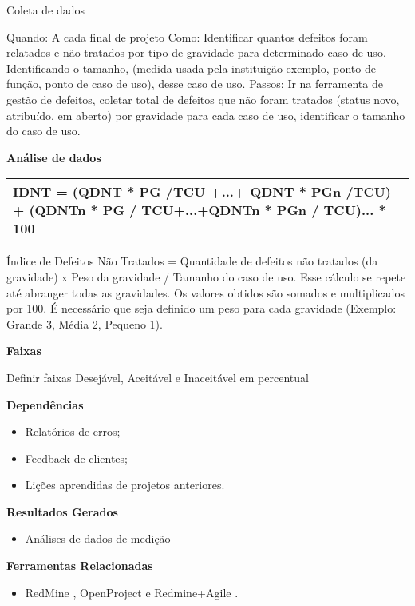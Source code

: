 Coleta de dados

Quando: A cada final de projeto Como: Identificar quantos defeitos foram relatados e não tratados por tipo de gravidade para determinado caso de uso. Identificando o tamanho, (medida usada pela instituição exemplo, ponto de função, ponto de caso de uso), desse caso de uso. Passos: Ir na ferramenta de gestão de defeitos, coletar total de defeitos que não foram tratados (status novo, atribuído, em aberto) por gravidade para cada caso de uso, identificar o tamanho do caso de uso.

\textbf{Análise de dados}

\begin{table}[!ht]
\centering
\begin{tabular}{|p{130mm}|}
\hline
IDNT = (QDNT * PG /TCU +...+ QDNT * PGn /TCU) + (QDNTn * PG / TCU+...+QDNTn * PGn / TCU)... * 100 \\ 
\hline
\end{tabular}
\end{table}

Índice de Defeitos Não Tratados = Quantidade de defeitos não tratados (da gravidade) x Peso da gravidade / Tamanho do caso de uso. Esse cálculo se repete até abranger todas as gravidades. Os valores obtidos são somados e multiplicados por 100. É necessário que seja definido um peso para cada gravidade (Exemplo: Grande 3, Média 2, Pequeno 1).

\textbf{Faixas}

Definir faixas Desejável, Aceitável e Inaceitável em percentual


\textbf{Dependências}

\begin{itemize}
    \item Relatórios de erros;
    \item Feedback de clientes;
    \item Lições aprendidas de projetos anteriores.
\end{itemize}

\textbf{ Resultados Gerados }
\begin{itemize}
    \item Análises de dados de medição
\end{itemize}

\textbf{ Ferramentas Relacionadas }
\begin{itemize}
    \item RedMine \cite{Redmine}, OpenProject \cite{OpenProject} e Redmine+Agile \cite{RedmineUP}.
\end{itemize}


